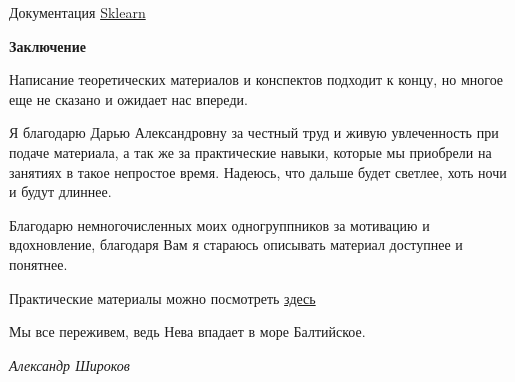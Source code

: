 \documentclass[aps,%
12pt,%
final,%
oneside,
onecolumn,%
musixtex, %
superscriptaddress,%
centertags]{article} %
\theoremstyle{plain}
\theoremstyle{definition}
\theoremstyle{remark}
\begin{document}
Документация \href{https://scikit-learn.org/stable/}{Sklearn}


\newpage
\textbf{Заключение}

Написание теоретических материалов и конспектов подходит к концу, но многое еще не сказано и ожидает нас впереди. 

Я благодарю Дарью Александровну за честный труд и живую увлеченность при подаче материала, а так же за практические навыки, которые мы приобрели на занятиях в такое непростое время. Надеюсь, что дальше будет светлее, хоть ночи и будут длиннее.

Благодарю немногочисленных моих одногруппников за мотивацию и вдохновление, благодаря Вам я стараюсь описывать материал доступнее и понятнее.

Практические материалы можно посмотреть \href{https://github.com/aptmess/methods-of-forecasting}{здесь}

Мы все переживем, ведь Нева впадает в море Балтийское.

\textit{Александр Широков}
\end{document}
